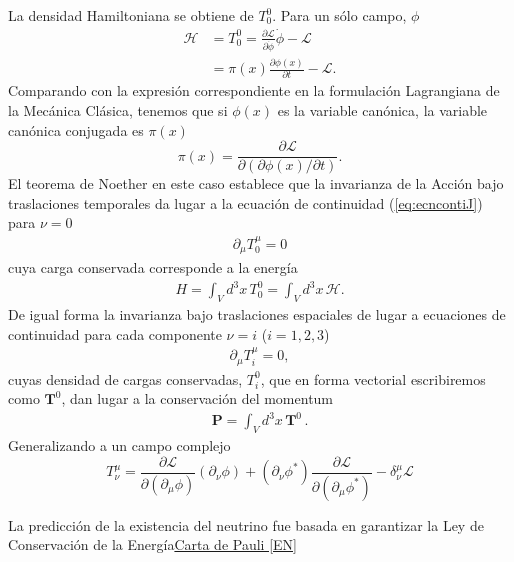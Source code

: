 \begin{frame}
La densidad Hamiltoniana se obtiene de $T^0_0$. Para un sólo campo, $\phi$
\begin{align}
  \label{eq:3}
\mathcal{H}&=T^0_0=\frac{\partial\mathcal{L}}{\partial\dot{\phi}}\dot{\phi}
      -\mathcal{L}\\
      &=\pi(x)\frac{\partial\phi(x)}{\partial t}-\mathcal{L}.
\end{align}
Comparando con la expresión correspondiente en la formulación
Lagrangiana de la Mecánica Clásica, tenemos que si $\phi(x)$ es la
variable canónica, la variable canónica conjugada es $\pi(x)$
\begin{equation}
  \label{eq:4}
  \pi(x)=\frac{\partial\mathcal{L}}{\partial(\partial\phi(x)/\partial t)}.
\end{equation}
El teorema de Noether en este caso establece que la invarianza de la Acción bajo traslaciones temporales da lugar a la ecuación de continuidad (\ref{eq:ecncontiJ}) para $\nu=0$
\begin{align}
\label{eq:122}
  \partial_\mu T^\mu_0=0
\end{align}
cuya carga conservada corresponde a la energía
\begin{align}
  H=\int_V d^3x\, T^0_0=\int_V d^3x\,\mathcal{H}.
\end{align}
De igual forma la invarianza bajo traslaciones espaciales de lugar a ecuaciones de continuidad para cada componente $\nu=i$
 ($i=1,2,3$)
 \begin{align}
   \label{eq:235}
   \partial_\mu T^\mu_i=0,
 \end{align}
cuyas densidad de cargas conservadas, $T^0_i$, que en forma vectorial escribiremos como $\mathbf{T}^0$, dan lugar a la conservación del momentum
\begin{align}
  \mathbf{P}=\int_V d^3x\,\mathbf{T}^0\,.
\end{align}
Generalizando a un campo complejo
\begin{equation}
  \label{eq:138}
     T^\mu_\nu=\frac{\partial\mathcal{L}}{\partial(\partial_\mu\phi)}(\partial_\nu\phi)+(\partial_\nu\phi^*)\frac{\partial\mathcal{L}}{\partial(\partial_\mu\phi^*)}
      -\delta^\mu_\nu\mathcal{L}
\end{equation}

\end{frame}
La predicción de la existencia del neutrino fue basada en garantizar la Ley de Conservación de la Energía\href{https://www.symmetrymagazine.org/sites/default/files/legacy/pdfs/200703/logbook_letter_translation.pdf}{Carta de Pauli [EN]}


